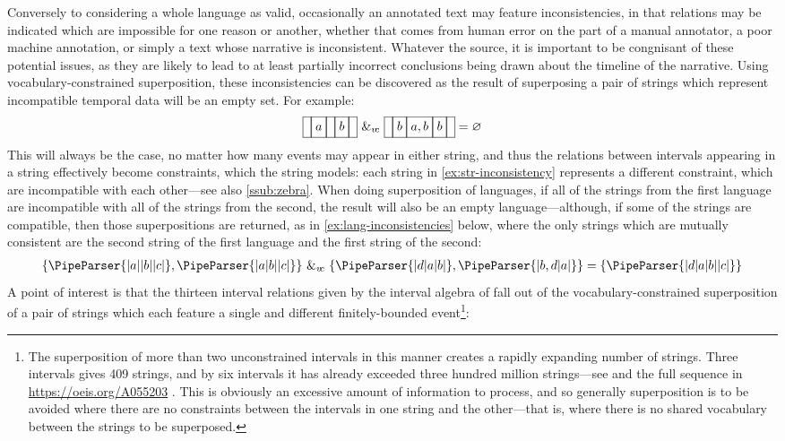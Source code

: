 \documentclass[a4paper,12pt,leqno]{article}
\newcommand{\vph}[1]{\vphantom{#1}}
\newcommand{\ebox}[1]{\fbox{$\vph{'(),}#1$}}
\newcommand{\nbBefore}[2]{\ebox{#1}\ebox{}\ebox{#2}}
\newcommand{\nbDuring}[2]{\ebox{#2}\ebox{#1,#2}\ebox{#2}}
\newcommand{\Before}[2]{\ebox{}\nbBefore{#1}{#2}\ebox{}}
\newcommand{\During}[2]{\ebox{}\nbDuring{#1}{#2}\ebox{}}
\newcommand{\spvc}{~\&_{v\!c}~}
\renewcommand{\emptyset}{\varnothing}
\newcommand{\EventString}[1]{%
	\renewcommand*{\do}[1]{\ebox{##1}}%
	\PipeParser{#1}%
}
\begin{document}
Conversely to considering a whole language as valid, occasionally an annotated text may feature inconsistencies, in that relations may be indicated which are impossible for one reason or another, whether that comes from human error on the part of a manual annotator, a poor machine annotation, or simply a text whose narrative is inconsistent. Whatever the source, it is important to be congnisant of these potential issues, as they are likely to lead to at least partially incorrect conclusions being drawn about the timeline of the narrative. Using vocabulary-constrained superposition, these inconsistencies can be discovered as the result of superposing a pair of strings which represent incompatible temporal data will be an empty set. For example:
\begin{align}
	\Before{a}{b} \spvc \During{a}{b} = \emptyset\label{ex:str-inconsistency}
\end{align}
This will always be the case, no matter how many events may appear in either string, and thus the relations between intervals appearing in a string effectively become constraints, which the string models: each string in \cref{ex:str-inconsistency} represents a different constraint, which are incompatible with each other---see also \cref{ssub:zebra}. When doing superposition of languages, if all of the strings from the first language are incompatible with all of the strings from the second, the result will also be an empty language---although, if some of the strings are compatible, then those superpositions are returned, as in \cref{ex:lang-inconsistencies} below, where the only strings which are mutually consistent are the second string of the first language and the first string of the second:
\begin{align}
	\{\EventString{{}|a|{}|b|{}|c|{}}, \EventString{{}|a|b|{}|c|{}}\} \spvc \{\EventString{{}|d|a|b|{}}, \EventString{{}|b,d|a|{}}\} = \{\EventString{{}|d|a|b|{}|c|{}}\}\label{ex:lang-inconsistencies}
\end{align}
A point of interest is that the thirteen interval relations given by the interval algebra of \citet{allen1983maintaining} fall out of the vocabulary-constrained superposition of a pair of strings which each feature a single and different finitely-bounded event\footnote{The superposition of more than two unconstrained intervals in this manner creates a rapidly expanding number of strings. Three intervals gives 409 strings, and by six intervals it has already exceeded three hundred million strings---see \citet[p. 129]{woods2017towards} and the full sequence in \url{https://oeis.org/A055203} \citep{oeisA055203}. This is obviously an excessive amount of information to process, and so generally superposition is to be avoided where there are no constraints between the intervals in one string and the other---that is, where there is no shared vocabulary between the strings to be superposed.}:
\end{document}
